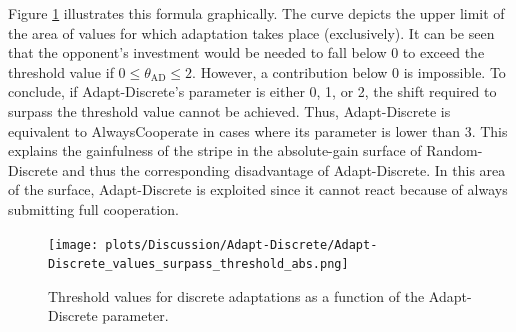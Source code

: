 \documentclass[11pt]{article}
\begin{document}
	\noindent
	Figure \ref{fig:surpass_theshold_abs} illustrates this formula graphically.
	The curve depicts the upper limit of the area of values for which adaptation takes place (exclusively).
	It can be seen that the opponent's investment would be needed to fall below 0 to exceed the threshold value if $0 \le \theta_{\mathrm{AD}} \le 2$.
	However, a contribution below 0 is impossible.
	To conclude, if Adapt-Discrete's parameter is either 0, 1, or 2, the shift required to surpass the threshold value cannot be achieved.
	Thus, Adapt-Discrete is equivalent to AlwaysCooperate in cases where its parameter is lower than 3.
	This explains the gainfulness of the stripe in the absolute-gain surface of Random-Discrete and thus the corresponding disadvantage of Adapt-Discrete.
	In this area of the surface, Adapt-Discrete is exploited since it cannot react because of always submitting full cooperation.

	\begin{figure}[h]
		\begin{center}
			\texttt{[image: plots/Discussion/Adapt-Discrete/Adapt-Discrete\_values\_surpass\_threshold\_abs.png]}
		\end{center}
		\caption{Threshold values for discrete adaptations as a function of the Adapt-Discrete parameter.}
		\label{fig:surpass_theshold_abs}
	\end{figure}

\end{document}
